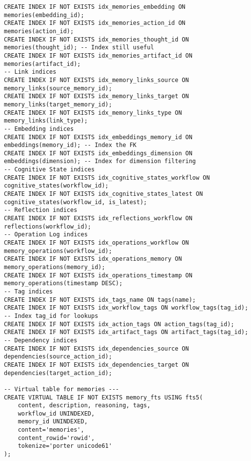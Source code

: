 \documentclass[12pt,a4paper]{article}
\begin{document}
\begin{pageablecode}
\begin{verbatim}
CREATE INDEX IF NOT EXISTS idx_memories_embedding ON memories(embedding_id);
CREATE INDEX IF NOT EXISTS idx_memories_action_id ON memories(action_id);
CREATE INDEX IF NOT EXISTS idx_memories_thought_id ON memories(thought_id); -- Index still useful
CREATE INDEX IF NOT EXISTS idx_memories_artifact_id ON memories(artifact_id);
-- Link indices
CREATE INDEX IF NOT EXISTS idx_memory_links_source ON memory_links(source_memory_id);
CREATE INDEX IF NOT EXISTS idx_memory_links_target ON memory_links(target_memory_id);
CREATE INDEX IF NOT EXISTS idx_memory_links_type ON memory_links(link_type);
-- Embedding indices
CREATE INDEX IF NOT EXISTS idx_embeddings_memory_id ON embeddings(memory_id); -- Index the FK
CREATE INDEX IF NOT EXISTS idx_embeddings_dimension ON embeddings(dimension); -- Index for dimension filtering
-- Cognitive State indices
CREATE INDEX IF NOT EXISTS idx_cognitive_states_workflow ON cognitive_states(workflow_id);
CREATE INDEX IF NOT EXISTS idx_cognitive_states_latest ON cognitive_states(workflow_id, is_latest);
-- Reflection indices
CREATE INDEX IF NOT EXISTS idx_reflections_workflow ON reflections(workflow_id);
-- Operation Log indices
CREATE INDEX IF NOT EXISTS idx_operations_workflow ON memory_operations(workflow_id);
CREATE INDEX IF NOT EXISTS idx_operations_memory ON memory_operations(memory_id);
CREATE INDEX IF NOT EXISTS idx_operations_timestamp ON memory_operations(timestamp DESC);
-- Tag indices
CREATE INDEX IF NOT EXISTS idx_tags_name ON tags(name);
CREATE INDEX IF NOT EXISTS idx_workflow_tags ON workflow_tags(tag_id); -- Index tag_id for lookups
CREATE INDEX IF NOT EXISTS idx_action_tags ON action_tags(tag_id);
CREATE INDEX IF NOT EXISTS idx_artifact_tags ON artifact_tags(tag_id);
-- Dependency indices
CREATE INDEX IF NOT EXISTS idx_dependencies_source ON dependencies(source_action_id);
CREATE INDEX IF NOT EXISTS idx_dependencies_target ON dependencies(target_action_id);

-- Virtual table for memories ---
CREATE VIRTUAL TABLE IF NOT EXISTS memory_fts USING fts5(
    content, description, reasoning, tags,
    workflow_id UNINDEXED,
    memory_id UNINDEXED,
    content='memories',
    content_rowid='rowid',
    tokenize='porter unicode61'
);


\end{verbatim}
\end{pageablecode}
\end{document}
